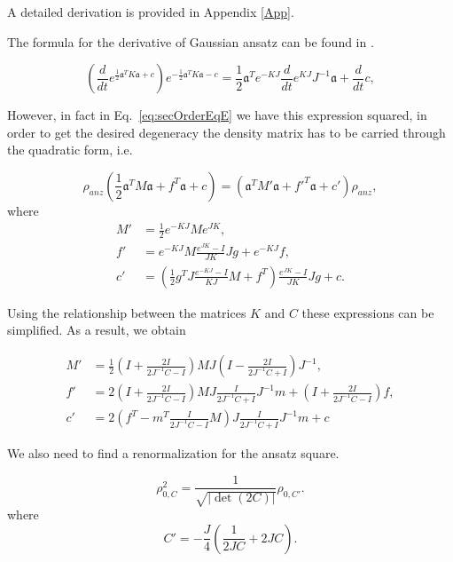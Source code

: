 \documentclass[12pt]{article}
\theoremstyle{definition}
\newcommand{\mf}[1]{\mathfrak{#1}}
\begin{document}
	A detailed derivation is provided in  Appendix \ref{App}.
	
	The formula for the derivative of Gaussian ansatz can be found in \cite{Dis}.
	
	\begin{equation}
		\label{eq:difofrho}
		\left(\dfrac{d}{dt}e^{\frac{1}{2}\mathfrak{a}^TK\mathfrak{a} + c}\right)e^{-\frac{1}{2}\mathfrak{a}^TK\mathfrak{a} - c} = \dfrac{1}{2}\mathfrak{a}^Te^{-KJ}\dfrac{d}{dt}e^{KJ}J^{-1}\mathfrak{a} + \dfrac{d}{dt}c,
	\end{equation}
	
	
	
	
	However, in fact in Eq.~\eqref{eq:secOrderEqE} we have this expression squared, in order to get the desired degeneracy the density matrix has to be carried through the quadratic form, i.e.
	
	\begin{equation}
		\label{eq:DenMatrOverForm}
		\rho_{anz}(\frac{1}{2}\mf{a}^TM\mf{a} + f^T\mf{a} + c) = (\mf{a}^TM'\mf{a} + f'^T\mf{a} + c')\rho_{anz},
	\end{equation}
	where
	\begin{align*}
		M' &= \frac{1}{2}e^{-KJ}Me^{JK}, \\
		f' &= e^{-KJ}M\frac{e^{JK} - I}{JK}Jg + e^{-KJ}f, \\
		c' &= \left( \frac{1}{2}g^TJ\frac{e^{-KJ} - I}{KJ}M +f^T  \right)\frac{e^{JK} - I}{JK}Jg + c.
	\end{align*}
	
	Using the relationship between the matrices $K$ and $C$ these expressions can be simplified. As a result, we obtain
	
	\begin{align}
		M' &= \frac{1}{2}\left(I + \frac{2I}{2J^{-1}C - I}\right)MJ\left(I - \frac{2I}{2J^{-1}C + I}\right)J^{-1}, \\
		f' &= 2\left(I + \frac{2I}{2J^{-1}C - I}\right)MJ\frac{I}{2J^{-1}C + I}J^{-1}m + \left(I + \frac{2I}{2J^{-1}C - I}\right)f, \\
		c' &= 2\left(f^T - m^T\frac{I}{2J^{-1}C - I}M\right)J\frac{I}{2J^{-1}C + I}J^{-1}m + c
	\end{align}
	
	We also need to find a renormalization for the ansatz square. 
	
	\begin{equation}
		\label{eq:RhoSq}
		\rho_{0,C}^2 = \frac{1}{\sqrt{|\det(2 C)|}} \rho_{0,C'}.
	\end{equation}
	where 
	\begin{equation*}
		C' = - \frac{J}{4}\left(\frac{1}{2 J C} + 2 J C\right).
	\end{equation*}
	
\end{document}
